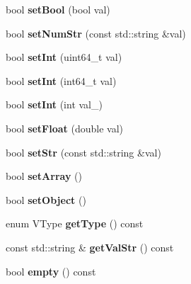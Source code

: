 \begin{DoxyCompactItemize}
bool {\bfseries set\+Bool} (bool val)
\item 
\mbox{\label{class_uni_value_a073f2837ea47118d3be94360e3e93061}} 
bool {\bfseries set\+Num\+Str} (const std\+::string \&val)
\item 
\mbox{\label{class_uni_value_a9b2df9e0db0d6370fd59783a7942af91}} 
bool {\bfseries set\+Int} (uint64\+\_\+t val)
\item 
\mbox{\label{class_uni_value_a9b075d0074d27b123cc5b5373865f06d}} 
bool {\bfseries set\+Int} (int64\+\_\+t val)
\item 
\mbox{\label{class_uni_value_a399dec41fb611a7ee763140977df047a}} 
bool {\bfseries set\+Int} (int val\+\_\+)
\item 
\mbox{\label{class_uni_value_af887f08e539e589accea7beebd51eaae}} 
bool {\bfseries set\+Float} (double val)
\item 
\mbox{\label{class_uni_value_ac20022e977498c332838daf4bf4f0948}} 
bool {\bfseries set\+Str} (const std\+::string \&val)
\item 
\mbox{\label{class_uni_value_a00c402e60dbabcf3b4ea4246552bcacb}} 
bool {\bfseries set\+Array} ()
\item 
\mbox{\label{class_uni_value_a0894e98fb8db031d2477c70147e0fd18}} 
bool {\bfseries set\+Object} ()
\item 
\mbox{\label{class_uni_value_a2dbc9c5aa9d209338b0bef650f3d1987}} 
enum V\+Type {\bfseries get\+Type} () const
\item 
\mbox{\label{class_uni_value_a4c9a5fa9114affbf31f6e346c032be12}} 
const std\+::string \& {\bfseries get\+Val\+Str} () const
\item 
\mbox{\label{class_uni_value_a6cf106f8b73c526b50d0c77a36a2d8ec}} 
bool {\bfseries empty} () const
\item 
\mbox{\label{class_uni_value_a5a7394aeb8d5584db7a90c2c041726b1}} 

\end{DoxyCompactItemize}

